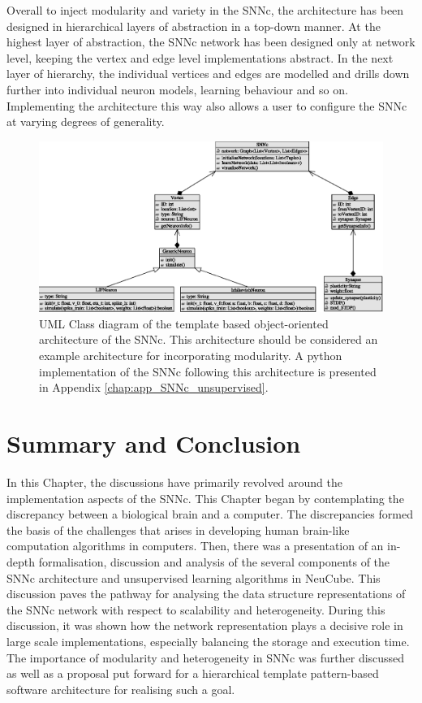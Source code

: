 Overall to inject modularity and variety in the SNNc, the architecture has been designed in hierarchical layers of abstraction in a top-down manner. At the highest layer of abstraction, the SNNc network has been designed only at network level, keeping the vertex and edge level implementations abstract. In the next layer of hierarchy, the individual vertices and edges are modelled and drills down further into individual neuron models, learning behaviour and so on. Implementing the architecture this way also allows a user to configure the SNNc at varying degrees of generality.     
\begin{figure}
	\centering
	\includegraphics[width=0.8\linewidth]{fig/largesnn/class_diagram.eps}
	\caption{UML Class diagram of the template based object-oriented architecture of the SNNc. This architecture should be considered an example architecture for incorporating modularity. A python implementation of the SNNc following this architecture is presented in Appendix \ref{chap:app_SNNc_unsupervised}.}
	\label{fig:class_diagram}
\end{figure}

\section{Summary and Conclusion}
In this Chapter, the discussions have primarily revolved around the implementation aspects of the SNNc. This Chapter began by contemplating the discrepancy between a biological brain and a computer. The discrepancies formed the basis of the challenges that arises in developing human brain-like computation algorithms in computers. Then, there was a presentation of an in-depth formalisation, discussion and analysis of the several components of the SNNc architecture and unsupervised learning algorithms in NeuCube. This discussion paves the pathway for analysing the data structure representations of the SNNc network with respect to scalability and heterogeneity. During this discussion, it was shown how the network representation plays a decisive role in large scale implementations, especially balancing the storage and execution time. The importance of modularity and heterogeneity in SNNc was further discussed as well as a proposal put forward for a hierarchical template pattern-based software architecture for realising such a goal.


